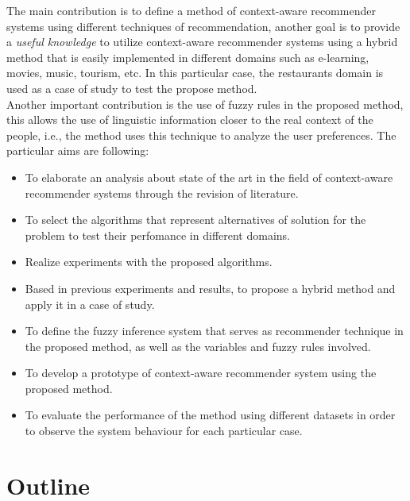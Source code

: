 The main contribution is to define a method of context-aware
recommender systems using different techniques of recommendation,
another goal is to provide a \textit{useful knowledge} 
to utilize context-aware recommender systems
using a hybrid method that is easily implemented in different domains
such as e-learning, movies, music, tourism, etc. In this particular
case, the restaurants domain is used as a case of study to test the
propose method. \\ Another important contribution is the use of fuzzy rules in the
proposed method, this allows the use of linguistic
information closer to the real context of the people, i.e., 
the method uses this technique to analyze the user preferences.
The particular aims are following:
\begin{itemize}  
\item To elaborate an analysis about state of the art in the field
of context-aware recommender systems through  the revision of
literature. 
\item To select the algorithms that represent alternatives of
solution for the problem to test their perfomance in different
domains.
\item Realize experiments with the proposed algorithms.
\item Based in previous experiments and results, to propose a hybrid method and apply it in a case of study.  
\item To define the fuzzy inference system that serves as recommender technique in the proposed method, as well as the variables and fuzzy rules involved.
\item To develop a prototype of context-aware recommender system 
using the proposed method.
\item To evaluate the performance of the method using 
different datasets in order to observe the system behaviour 
for each particular case.
\end{itemize} 

\section{Outline}

